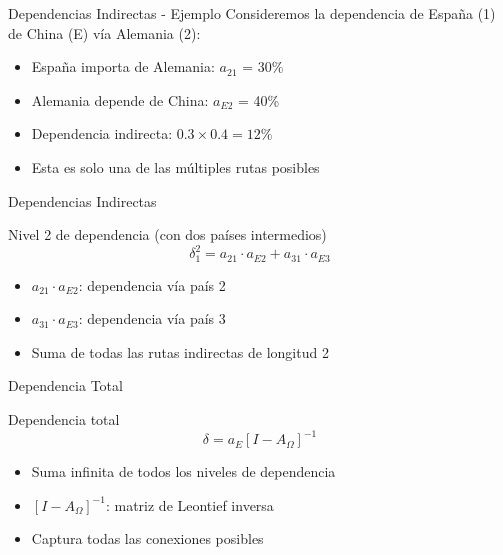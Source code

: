 \documentclass{beamer}
\begin{document}
\begin{frame}{Dependencias Indirectas - Ejemplo}
    Consideremos la dependencia de España (1) de China (E) vía Alemania (2):
    \begin{itemize}
        \item España importa de Alemania: $a_{21}$ = 30\%
        \item Alemania depende de China: $a_{E2}$ = 40\%
        \item Dependencia indirecta: $0.3 \times 0.4 = 12\%$
        \item Esta es solo una de las múltiples rutas posibles
    \end{itemize}
\end{frame}

\begin{frame}{Dependencias Indirectas}
    \begin{block}{Nivel 2 de dependencia (con dos países intermedios)}
        \[ \delta_1^2 = a_{21} \cdot a_{E2} + a_{31} \cdot a_{E3} \]
        \begin{itemize}
            \item $a_{21} \cdot a_{E2}$: dependencia vía país 2
            \item $a_{31} \cdot a_{E3}$: dependencia vía país 3
            \item Suma de todas las rutas indirectas de longitud 2
        \end{itemize}
    \end{block}
\end{frame}

\begin{frame}{Dependencia Total}    
    \begin{block}{Dependencia total}
        \[ \delta = a_E\left[I-A_{\Omega}\right]^{-1} \]
        \begin{itemize}
            \item Suma infinita de todos los niveles de dependencia
            \item $[I-A_{\Omega}]^{-1}$: matriz de Leontief inversa
            \item Captura todas las conexiones posibles
        \end{itemize}
    \end{block}
\end{frame}
\end{document}
